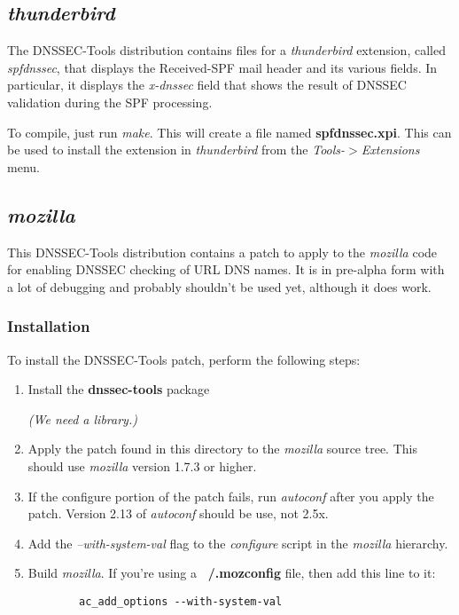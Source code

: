 \documentclass[12pt]{article}
\newcommand{\cmd}[1]{{\em #1}}
\newcommand{\path}[1]{{\bf #1}}
\begin{document}

\subsection{\cmd{thunderbird}}

The DNSSEC-Tools distribution contains files for a \cmd{thunderbird}
extension, called {\it spfdnssec}, that displays the Received-SPF mail header
and its various fields.  In particular, it displays the {\it x-dnssec} field
that shows the result of DNSSEC validation during the SPF processing.

To compile, just run \cmd{make}.  This will create a file named
\path{spfdnssec.xpi}.  This can be used to install the extension in
\cmd{thunderbird} from the {\it Tools-$>$Extensions} menu.



\subsection{\cmd{mozilla}}

This DNSSEC-Tools distribution contains a patch to apply to the \cmd{mozilla}
code for enabling DNSSEC checking of URL DNS names.  It is in pre-alpha form
with a lot of debugging and probably shouldn't be used yet, although it does
work.


\subsubsection{Installation}

To install the DNSSEC-Tools patch, perform the following steps:

\begin{enumerate}

\item Install the \path{dnssec-tools} package

{\it (We need a library.)}

\item Apply the patch found in this directory to the \cmd{mozilla} source tree.
This should use \cmd{mozilla} version 1.7.3 or higher.

\item If the configure portion of the patch fails, run \cmd{autoconf}
after you apply the patch.  Version 2.13 of \cmd{autoconf} should be use,
not 2.5x.

\item Add the {\it --with-system-val} flag to the \cmd{configure} script in the
\cmd{mozilla} hierarchy.

\item Build \cmd{mozilla}.  If you're using a \path{~/.mozconfig} file,
then add this line to it:
\begin{verbatim}
        ac_add_options --with-system-val
\end{verbatim}

\end{enumerate}
\end{document}
